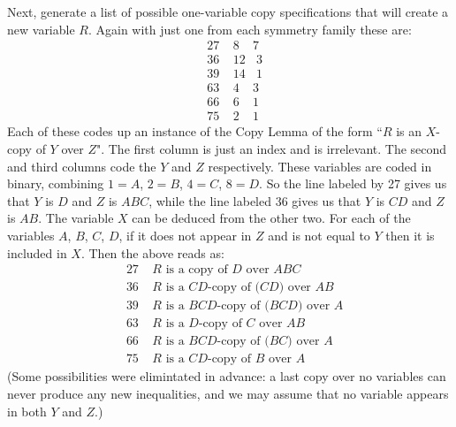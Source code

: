 \documentclass[10pt,journal]{IEEEtran}
\begin{document}
Next, generate a list of possible one-variable copy specifications
that will create a new variable $R$.  Again with just one from each symmetry family these are:
\begin{align*}
      &27   \ \ \ \ \  8  \ \ \ \ \ 7        \\
        &36   \ \ \ \ \ 12   \ \ \ \ 3        \\
        &39   \ \ \ \ \ 14   \ \ \ \ 1        \\
        &63   \ \ \ \ \  4  \ \ \ \ \ 3        \\
        &66   \ \ \ \ \  6  \ \ \ \ \ 1        \\
       &75   \ \ \ \ \  2  \ \ \ \ \ 1
\end{align*}
Each of these codes up an instance of the Copy Lemma of the form ``$R$ is an $X$-copy of $Y$ over $Z$".
The first column is just an index and is irrelevant. The second and third columns
code the $Y$ and $Z$ respectively.
These variables are coded in binary, combining $1=A$, $2=B$, $4=C$, $8=D$.
So the line labeled by 27 gives us that $Y$ is $D$ and $Z$ is $ABC$, while the
line labeled 36 gives us that $Y$ is $CD$ and $Z$ is $AB$.
The variable $X$ can be deduced from the other two.  For each of the variables
$A$, $B$, $C$, $D$, if it does not appear in $Z$ and is not equal to $Y$ then it is included
in $X$.  Then the above reads as:
\begin{align*}
        &27   \ \ \ \ \ \text{$R$ is a copy of $D$ over $ABC$}      \\
        &36   \ \ \ \ \ \text{$R$ is a $CD$-copy of ($CD$) over $AB$ }      \\
        &39   \ \ \ \ \ \text{$R$ is a $BCD$-copy of ($BCD$) over $A$}       \\
        &63   \ \ \ \ \ \text{$R$ is a $D$-copy of $C$ over $AB$}       \\
        &66   \ \ \ \ \ \text{$R$ is a $BCD$-copy of ($BC$) over $A$}       \\
        &75   \ \ \ \ \ \text{$R$ is a $CD$-copy of $B$ over $A$}
\end{align*}
(Some possibilities were elimintated in advance: a last copy over no variables can
never produce any new inequalities, and we may assume that no variable
appears in both $Y$ and $Z$.)
\end{document}
